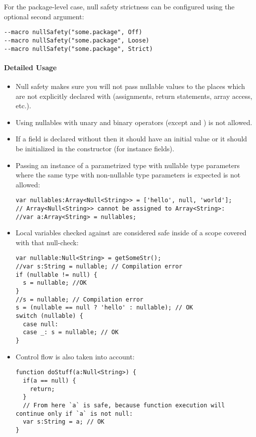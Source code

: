 For the package-level case, null safety strictness can be configured using the optional second argument:

\begin{lstlisting}
--macro nullSafety("some.package", Off)
--macro nullSafety("some.package", Loose)
--macro nullSafety("some.package", Strict)
\end{lstlisting}

\paragraph{Detailed Usage}

\begin{itemize}
	\item Null safety makes sure you will not pass nullable values to the places which are not explicitly declared with  (assignments, return statements, array access, etc.).
	\item Using nullables with unary and binary operators (except \expr{==} and \expr{!=}) is not allowed.
	\item If a field is declared without  then it should have an initial value or it should be initialized in the constructor (for instance fields).
	\item Passing an instance of a parametrized type with nullable type parameters where the same type with non-nullable type parameters is expected is not allowed:
	\begin{lstlisting}
var nullables:Array<Null<String>> = ['hello', null, 'world'];
// Array<Null<String>> cannot be assigned to Array<String>:
//var a:Array<String> = nullables;
\end{lstlisting}
	\item Local variables checked against  are considered safe inside of a scope covered with that null-check:
	\begin{lstlisting}
var nullable:Null<String> = getSomeStr();
//var s:String = nullable; // Compilation error
if (nullable != null) {
  s = nullable; //OK
}
//s = nullable; // Compilation error
s = (nullable == null ? 'hello' : nullable); // OK
switch (nullable) {
  case null:
  case _: s = nullable; // OK
}
\end{lstlisting}
	\item Control flow is also taken into account:
	\begin{lstlisting}
function doStuff(a:Null<String>) {
  if(a == null) {
    return;
  }
  // From here `a` is safe, because function execution will continue only if `a` is not null:
  var s:String = a; // OK
}
\end{lstlisting}
\end{itemize}

